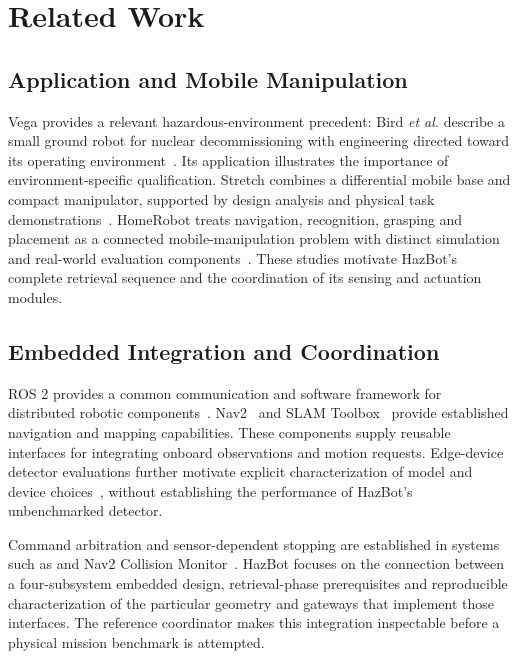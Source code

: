 \section{Related Work}
\subsection{Application and Mobile Manipulation}
Vega provides a relevant hazardous-environment precedent: Bird \emph{et al.} describe a small ground robot for nuclear decommissioning with engineering directed toward its operating environment~\cite{bird2022vega}. Its application illustrates the importance of environment-specific qualification. Stretch combines a differential mobile base and compact manipulator, supported by design analysis and physical task demonstrations~\cite{kemp2022stretch}. HomeRobot treats navigation, recognition, grasping and placement as a connected mobile-manipulation problem with distinct simulation and real-world evaluation components~\cite{yenamandra2023homerobot}. These studies motivate HazBot's complete retrieval sequence and the coordination of its sensing and actuation modules.

\subsection{Embedded Integration and Coordination}
ROS 2 provides a common communication and software framework for distributed robotic components~\cite{macenski2022ros2}. Nav2~\cite{macenski2020marathon2} and SLAM Toolbox~\cite{macenski2021slamtoolbox} provide established navigation and mapping capabilities. These components supply reusable interfaces for integrating onboard observations and motion requests. Edge-device detector evaluations further motivate explicit characterization of model and device choices~\cite{alqahtani2026edge}, without establishing the performance of HazBot's unbenchmarked detector.

Command arbitration and sensor-dependent stopping are established in systems such as  and Nav2 Collision Monitor~\cite{twistmux,nav2collision}. HazBot focuses on the connection between a four-subsystem embedded design, retrieval-phase prerequisites and reproducible characterization of the particular geometry and gateways that implement those interfaces. The reference coordinator makes this integration inspectable before a physical mission benchmark is attempted.
